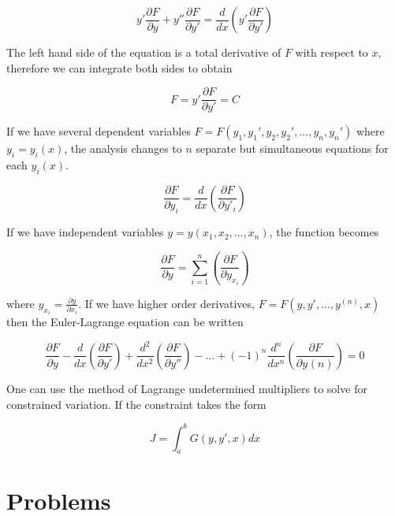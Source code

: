 \documentclass{tufte-book}
\newcommand{\pfrac}[2]{\frac{\partial {#1} }{\partial {#2} }}
\begin{document}
\begin{equation}
	\label{eq:10}
	y'\pfrac{F}{y} + y''\pfrac{F}{y'} = \frac{d}{dx}\left(y'\pfrac{F}{y'}\right)
\end{equation}

The left hand side of the equation is a total derivative of $F$ with respect to $x$, therefore we can integrate both sides to obtain

\begin{equation}
	\label{eq:el3}
	F = y'\pfrac{F}{y'} = C
\end{equation}

If we have several dependent variables $F = F(y_1, y_1', y_2, y_2', ..., y_n, y_n')$ where $y_i = y_i(x)$, the analysis changes to $n$ separate but simultaneous equations for each $y_i(x)$.

\begin{equation}
	\label{eq:el4}
	\pfrac{F}{y_i} = \frac{d}{dx}\left(\pfrac{F}{y'_i}\right)
\end{equation}

If we have independent variables $y = y(x_1, x_2, ..., x_n)$, the function becomes

\begin{equation}
	\label{eq:el5}
	\pfrac{F}{y} = \sum^n_{i=1}\left(\pfrac{F}{y_{x_i}}\right)
\end{equation}

where $y_{x_i} = \pfrac{y}{x_i}$. If we have higher order derivatives, $F = F(y, y', ..., y^{(n)}, x)$ then the Euler-Lagrange equation can be written

\begin{equation}
	\label{eq:el6}
	\pfrac{F}{y} - \frac{d}{dx}\left(\pfrac{F}{y'}\right) + \frac{d^2}{dx^2}\left(\pfrac{F}{y''}\right) - ... + (-1)^n \frac{d^n}{dx^n}\left(\pfrac{F}{y^{}(n)}\right) = 0
\end{equation}


One can use the method of Lagrange undetermined multipliers to solve for constrained variation. If the constraint takes the form

\begin{equation}
	\label{eq:11}
	J = \int^b_a G(y, y', x)dx
\end{equation}

\section{Problems}
\end{document}
